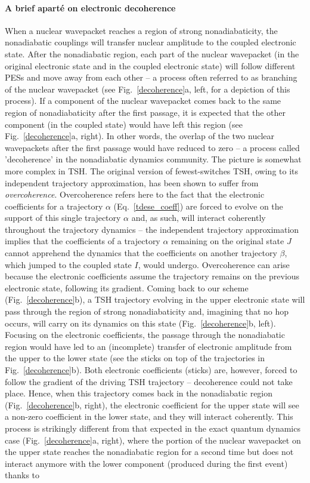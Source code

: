 \documentclass[9pt,bestpractices,pubversion]{livecoms}
\begin{document}
\paragraph{A brief apart\'{e} on electronic decoherence}
When a nuclear wavepacket reaches a region of strong nonadiabaticity, the nonadiabatic couplings will transfer nuclear amplitude to the coupled electronic state. After the nonadiabatic region, each part of the nuclear wavepacket (in the original electronic state and in the coupled electronic state) will follow different PESs and move away from each other -- a process often referred to as branching of the nuclear wavepacket (see Fig.~\ref{decoherence}a, left, for a depiction of this process). If a component of the nuclear wavepacket comes back to the same region of nonadiabaticity after the first passage, it is expected that the other component (in the coupled state) would have left this region (see Fig.~\ref{decoherence}a, right). In other words, the overlap of the two nuclear wavepackets after the first passage would have reduced to zero -- a process called 'decoherence' in the nonadiabatic dynamics community. The picture is somewhat more complex in TSH. The original version of fewest-switches TSH, owing to its independent trajectory approximation, has been shown to suffer from \textit{overcoherence}. Overcoherence refers here to the fact that the electronic coefficients for a trajectory $\alpha$ (Eq.~\eqref{tdese_coeff}) are forced to evolve on the support of this single trajectory $\alpha$ and, as such, will interact coherently throughout the trajectory dynamics -- the independent trajectory approximation implies that the coefficients of a trajectory $\alpha$ remaining on the original state $J$ cannot apprehend the dynamics that the coefficients on another trajectory $\beta$, which jumped to the coupled state $I$, would undergo. Overcoherence can arise because the electronic coefficients assume the trajectory remains on the previous electronic state, following its gradient. Coming back to our scheme (Fig.~\ref{decoherence}b), a TSH trajectory evolving in the upper electronic state will pass through the region of strong nonadiabaticity and, imagining that no hop occurs, will carry on its dynamics on this state (Fig.~\ref{decoherence}b, left). Focusing on the electronic coefficients, the passage through the nonadiabatic region would have led to an (incomplete) transfer of electronic amplitude from the upper to the lower state (see the sticks on top of the trajectories in Fig.~\ref{decoherence}b). Both electronic coefficients (sticks) are, however, forced to follow the gradient of the driving TSH trajectory -- decoherence could not take place. Hence, when this trajectory comes back in the nonadiabatic region (Fig.~\ref{decoherence}b, right), the electronic coefficient for the upper state will see a non-zero coefficient in the lower state, and they will interact coherently. This process is strikingly different from that expected in the exact quantum dynamics case (Fig.~\ref{decoherence}a, right), where the portion of the nuclear wavepacket on the upper state reaches the nonadiabatic region for a second time but does not interact anymore with the lower component (produced during the first event) thanks to 
\end{document}
